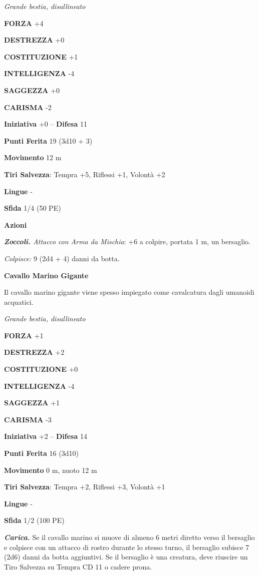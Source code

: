 \begin{multicols}{2}
\emph{Grande bestia, disallineato}

\textbf{FORZA} +4

\textbf{DESTREZZA} +0

\textbf{COSTITUZIONE} +1

\textbf{INTELLIGENZA} -4

\textbf{SAGGEZZA} +0

\textbf{CARISMA} -2

\textbf{Iniziativa} +0 -- \textbf{Difesa} 11

\textbf{Punti Ferita} 19 (3d10 + 3)

\textbf{Movimento} 12 m

\textbf{Tiri Salvezza}:  Tempra +5, Riflessi +1, Volontà +2 

\textbf{Lingue} -

\textbf{Sfida} 1/4 (50 PE)

\textbf{Azioni}

\emph{\textbf{Zoccoli.} Attacco con Arma da Mischia}: +6 a colpire, portata 1 m, un bersaglio.

\emph{Colpisce:} 9 (2d4 + 4) danni da botta.

\medskip\textbf{Cavallo Marino Gigante}

Il cavallo marino gigante viene spesso impiegato come cavalcatura dagli umanoidi acquatici.

\emph{Grande bestia, disallineato}

\textbf{FORZA} +1

\textbf{DESTREZZA} +2

\textbf{COSTITUZIONE} +0

\textbf{INTELLIGENZA} -4

\textbf{SAGGEZZA} +1

\textbf{CARISMA} -3

\textbf{Iniziativa} +2 -- \textbf{Difesa} 14

\textbf{Punti Ferita} 16 (3d10)

\textbf{Movimento} 0 m, nuoto 12 m

\textbf{Tiri Salvezza}: Tempra +2, Riflessi +3, Volontà +1

\textbf{Lingue} -

\textbf{Sfida} 1/2 (100 PE)

\emph{\textbf{Carica.}} Se il cavallo marino si muove di almeno 6 metri diretto verso il bersaglio e colpisce con un attacco di rostro durante lo stesso turno, il bersaglio subisce 7 (2d6) danni da botta aggiuntivi. Se il bersaglio è una creatura, deve riuscire un Tiro Salvezza su Tempra CD 11 o cadere prona.


\end{multicols}
